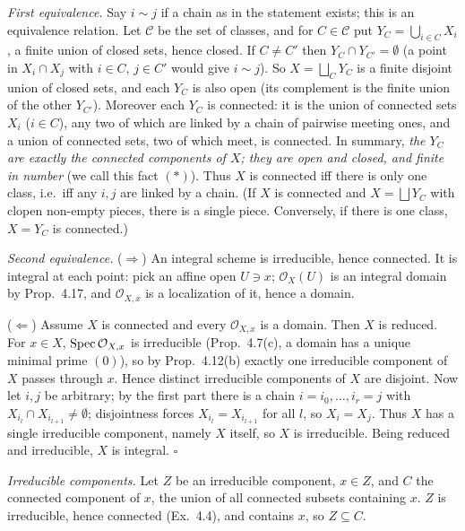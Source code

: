 \documentclass[11pt]{article}
\begin{document}
\emph{First equivalence.} Say $i\sim j$ if a chain as in the statement exists; this is an equivalence relation. Let $\mathcal C$ be the set of classes, and for $C\in\mathcal C$ put $Y_C=\bigcup_{i\in C}X_i$, a finite union of closed sets, hence closed. If $C\ne C'$ then $Y_C\cap Y_{C'}=\emptyset$ (a point in $X_i\cap X_j$ with $i\in C$, $j\in C'$ would give $i\sim j$). So $X=\bigsqcup_{C}Y_C$ is a finite disjoint union of closed sets, and each $Y_C$ is also open (its complement is the finite union of the other $Y_{C'}$). Moreover each $Y_C$ is connected: it is the union of connected sets $X_i$ ($i\in C$), any two of which are linked by a chain of pairwise meeting ones, and a union of connected sets, two of which meet, is connected. In summary, \emph{the $Y_C$ are exactly the connected components of $X$; they are open and closed, and finite in number} (we call this fact $(\ast)$).
Thus $X$ is connected iff there is only one class, i.e.\ iff any $i,j$ are linked by a chain. (If $X$ is connected and $X=\bigsqcup Y_C$ with clopen non-empty pieces, there is a single piece. Conversely, if there is one class, $X=Y_C$ is connected.)

\emph{Second equivalence.} ($\Rightarrow$) An integral scheme is irreducible, hence connected. It is integral at each point: pick an affine open $U\ni x$; $\mathcal O_X(U)$ is an integral domain by Prop.~4.17, and $\mathcal O_{X,x}$ is a localization of it, hence a domain.

($\Leftarrow$) Assume $X$ is connected and every $\mathcal O_{X,x}$ is a domain. Then $X$ is reduced. For $x\in X$, $\operatorname{Spec}\mathcal O_{X,x}$ is irreducible (Prop.~4.7(c), a domain has a unique minimal prime $(0)$), so by Prop.~4.12(b) exactly one irreducible component of $X$ passes through $x$. Hence distinct irreducible components of $X$ are disjoint. Now let $i,j$ be arbitrary; by the first part there is a chain $i=i_0,\dots,i_r=j$ with $X_{i_l}\cap X_{i_{l+1}}\ne\emptyset$; disjointness forces $X_{i_l}=X_{i_{l+1}}$ for all $l$, so $X_i=X_j$. Thus $X$ has a single irreducible component, namely $X$ itself, so $X$ is irreducible. Being reduced and irreducible, $X$ is integral. \hfill$\square$

\pf
\emph{Irreducible components.} Let $Z$ be an irreducible component, $x\in Z$, and $C$ the connected component of $x$, the union of all connected subsets containing $x$. $Z$ is irreducible, hence connected (Ex.~4.4), and contains $x$, so $Z\subseteq C$.
\end{document}
